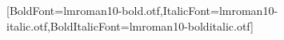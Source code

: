 \usepackage{fontspec}
\setmainfont{lmroman10-regular.otf}[BoldFont=lmroman10-bold.otf,ItalicFont=lmroman10-italic.otf,BoldItalicFont=lmroman10-bolditalic.otf]
